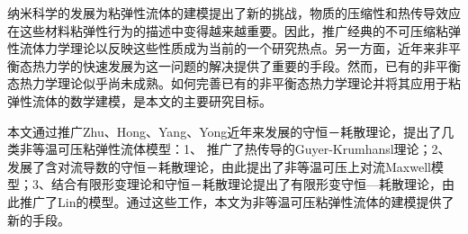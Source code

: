 
\begin{cabstract}
纳米科学的发展为粘弹性流体的建模提出了新的挑战，物质的压缩性和热传导效应在这些材料粘弹性行为的描述中变得越来越重要。因此，推广经典的不可压缩粘弹性流体力学理论以反映这些性质成为当前的一个研究热点。另一方面，近年来非平衡态热力学的快速发展为这一问题的解决提供了重要的手段。然而，已有的非平衡态热力学理论似乎尚未成熟。如何完善已有的非平衡态热力学理论并将其应用于粘弹性流体的数学建模，是本文的主要研究目标。



本文通过推广Zhu、Hong、Yang、Yong近年来发展的守恒－耗散理论，提出了几类非等温可压粘弹性流体模型：1、 推广了热传导的Guyer-Krumhansl理论；2、发展了含对流导数的守恒－耗散理论，由此提出了非等温可压上对流Maxwell模型；3、结合有限形变理论和守恒－耗散理论提出了有限形变守恒—耗散理论，由此推广了Lin的模型。通过这些工作，本文为非等温可压粘弹性流体的建模提供了新的手段。




\end{cabstract}
